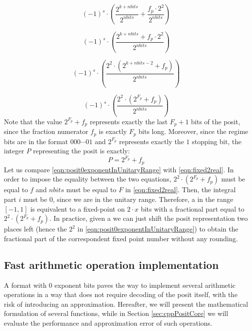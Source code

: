 \begin{equation*}
    (-1)^s \cdot \left ( \frac{2^{k+nbits}}{2^{nbits}} + \frac{f_p\cdot 2^2}{2^{nbits}} \right )
\end{equation*}

\begin{equation*}
    (-1)^s \cdot \left ( \frac{2^{k+nbits} + f_p\cdot 2^2}{2^{nbits}} \right )
\end{equation*}

\begin{equation*}
    (-1)^s \cdot \left ( \frac{2^2 \cdot (2^{k+ nbits - 2} + f_p)}{2^{nbits}} \right )
\end{equation*}

\begin{equation}\label{eqn:posit0exponentInUnitaryRange}
    (-1)^s \cdot \left ( \frac{2^2 \cdot (2^{F_p} + f_p)}{2^{nbits}} \right )
\end{equation}
Note that the value $2^{F_p} + f_p$ represents exactly the last $F_p + 1$ bits of the posit, since the fraction numerator $f_p$ is exactly $F_p$ bits long. Moreover, since the regime bits are in the format $000 \cdots 01$ and $2^{F_p}$ represents exactly the $1$ stopping bit, the integer $P$ representing the posit is exactly:
\begin{equation}\label{eqn:posit0expUnitary}
    P = 2^{F_p} + f_p
\end{equation}
Let us compare \eqref{eqn:posit0exponentInUnitaryRange} with \eqref{eqn:fixed2real}. In order to impose the equality between the two equations, $2^2 \cdot ( 2^{F_p} + f_p )$ must be equal to $f$ and $nbits$ must be equal to $F$ in \eqref{eqn:fixed2real}. Then, the integral part $i$ must be 0, since we are in the unitary range.
Therefore,  a  in the range $[-1,1]$ is equivalent to a fixed-point on $2\cdot x$ bits with a fractional part equal to $2^2 \cdot ( 2^{F_p} + f_p )$.
In practice, given a  we can just shift the posit representation two places left (hence the $2^2$ in \eqref{eqn:posit0exponentInUnitaryRange}) to obtain the fractional part of the correspondent fixed point number without any rounding.


\subsection{Fast arithmetic operation implementation
}\label{subsec:fastArithOps}

A format with $0$ exponent bits paves the way to implement several arithmetic operations in a way that does not require decoding of the posit itself, with the risk of introducing an approximation.
Hereafter, we will present the mathematical formulation of several functions, while in Section \ref{sec:cppPositCore} we will evaluate the performance and approximation error of such operations.

